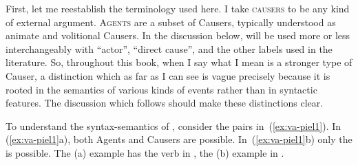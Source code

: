 \begin{exe}
\begin{xlist}
\begin{exe}
\begin{xlist}
\begin{exe}
\begin{xlist}
\begin{exe}
\begin{exe}
\begin{xlist}
\begin{exe}
\begin{xlist}
\begin{exe}
\begin{xlist}
\begin{exe}
\begin{xlist}
\begin{exe}
\begin{xlist}
\begin{exe}
\begin{xlist}
\begin{exe}
\begin{xlist}
\begin{exe}
\begin{xlist}
\begin{xlist}
\begin{exe}
\begin{xlist}
\begin{exe}
\begin{xlist}
\begin{exe}
\begin{xlist}
\begin{exe}
\begin{xlist}
\begin{exe}
\begin{xlist}
\begin{exe}
\begin{xlist}
\begin{exe}
\begin{xlist}
\begin{exe}
\begin{xlist}
\begin{exe}
\begin{xlist}
\begin{exe}
\begin{xlist}
\begin{exe}
\begin{xlist}
\begin{exe}
\begin{xlist}
\begin{xlist}
\begin{xlist}
\begin{exe}
\begin{xlist}
\begin{xlist}
\begin{xlist}
\begin{exe}
\begin{exe}
\begin{xlist}
First, let me reestablish the terminology used here. I take \textsc{causers} to be any kind of external argument. \textsc{Agents} are a subset of Causers, typically understood as animate and volitional Causers. In the discussion below, \textsc{} will be used more or less interchangeably with ``actor'', ``direct cause'', and the other labels used in the literature. So, throughout this book, when I say \textsc{} what I mean is a stronger type of Causer, a distinction which as far as I can see is vague precisely because it is rooted in the semantics of various kinds of events rather than in syntactic features. The discussion which follows should make these distinctions clear.

To understand the syntax-semantics of {\tpie}, consider the pairs in~(\ref{ex:va-piel1}). In (\ref{ex:va-piel1}a), both Agents and Causers are possible. In~(\ref{ex:va-piel1}b) only the  is possible. The (a) example has the verb in {\tkal}, the (b) example in {\tpie}.

 \begin{exe}
 \ex  \label{ex:va-piel1} 
 \begin{xlist} 
		

\end{xlist}
\end{exe}
\end{xlist}
\end{exe}
\end{exe}
\end{xlist}
\end{xlist}
\end{xlist}
\end{exe}
\end{xlist}
\end{xlist}
\end{xlist}
\end{exe}
\end{xlist}
\end{exe}
\end{xlist}
\end{exe}
\end{xlist}
\end{exe}
\end{xlist}
\end{exe}
\end{xlist}
\end{exe}
\end{xlist}
\end{exe}
\end{xlist}
\end{exe}
\end{xlist}
\end{exe}
\end{xlist}
\end{exe}
\end{xlist}
\end{exe}
\end{xlist}
\end{exe}
\end{xlist}
\end{xlist}
\end{exe}
\end{xlist}
\end{exe}
\end{xlist}
\end{exe}
\end{xlist}
\end{exe}
\end{xlist}
\end{exe}
\end{xlist}
\end{exe}
\end{xlist}
\end{exe}
\end{xlist}
\end{exe}
\end{exe}
\end{xlist}
\end{exe}
\end{xlist}
\end{exe}
\end{xlist}
\end{exe}
